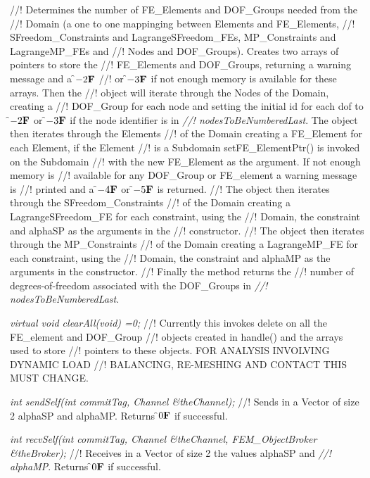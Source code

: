 //! Determines the number of FE\_Elements and DOF\_Groups needed from the
//! Domain (a one to one mappinging between Elements and FE\_Elements,
//! SFreedom\_Constraints and LagrangeSFreedom\_FEs, MP\_Constraints and LagrangeMP\_FEs and
//! Nodes and DOF\_Groups). Creates two arrays of pointers to store the
//! FE\_Elements and DOF\_Groups, returning a warning message and a \f$-2{\bf F}$
//! or \f$-3{\bf F}$ if not enough memory is available for these arrays. Then the
//! object will iterate through the Nodes of the Domain, creating a
//! DOF\_Group for each node and setting the initial id for each dof to
\f$-2{\bf F}$ or \f$-3{\bf F}$ if the node identifier is in {\em
//! nodesToBeNumberedLast}. The object then iterates through the Elements
//! of the Domain creating a FE\_Element for each Element, if the Element
//! is a Subdomain setFE\_ElementPtr() is invoked on the Subdomain
//! with the new FE\_Element as the argument. If not enough memory is
//! available for any DOF\_Group or FE\_element a warning message is
//! printed and a \f$-4{\bf F}$ or \f$-5{\bf F}$ is returned. 
//! The object then iterates through the SFreedom\_Constraints
//! of the Domain creating a LagrangeSFreedom\_FE for each constraint, using the
//! Domain, the constraint and \p alphaSP as the arguments in the
//! constructor.
//! The object then iterates through the MP\_Constraints
//! of the Domain creating a LagrangeMP\_FE for each constraint, using the
//! Domain, the constraint and \p alphaMP as the arguments in the constructor.
//! Finally the method returns the
//! number of degrees-of-freedom associated with the DOF\_Groups in {\em
//! nodesToBeNumberedLast}.

{\em virtual void clearAll(void) =0;}
//! Currently this invokes delete on all the FE\_element and DOF\_Group
//! objects created in handle() and the arrays used to store
//! pointers to these objects. FOR ANALYSIS INVOLVING DYNAMIC LOAD
//! BALANCING, RE-MESHING AND CONTACT THIS MUST CHANGE.

{\em int sendSelf(int commitTag, Channel \&theChannel); }
//! Sends in a Vector of size 2 \p alphaSP and \p alphaMP. Returns
\f$0{\bf F}$ if successful.

{\em int recvSelf(int commitTag, Channel \&theChannel, FEM\_ObjectBroker
\&theBroker); }
//! Receives in a Vector of size 2 the values \p alphaSP and {\em
//! alphaMP}. Returns \f$0{\bf F}$ if successful. 
